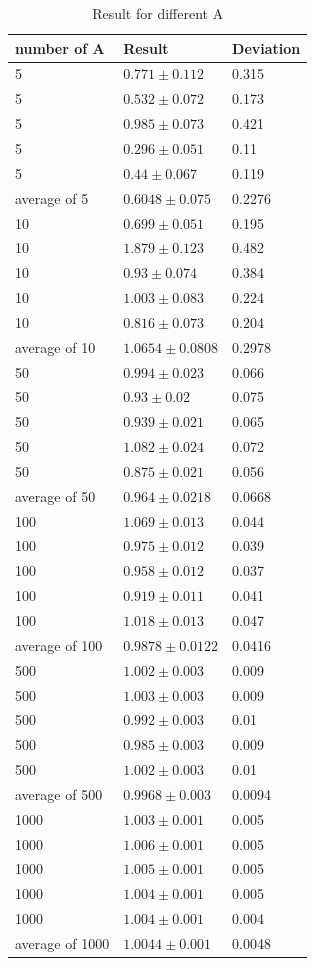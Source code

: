 \documentclass[11pt,letterpaper]{article}
\begin{document}
\begin{table}[h]
\caption{Result for different A\label{table1}}
\begin{tabular}{l l l}
\hline
 \textbf{number of A } & \textbf{Result}& \textbf{Deviation}\\
\hline
5	&$	0.771	\pm	0.112	$&	0.315	\\
5	&$	0.532	\pm	0.072	$&	0.173	\\
5	&$	0.985	\pm	0.073	$&	0.421	\\
5	&$	0.296	\pm	0.051	$&	0.11	\\
5	&$	0.44	\pm	0.067	$&	0.119	\\
average of 5	&$	0.6048	\pm	0.075	$&	0.2276	\\
10	&$	0.699	\pm	0.051	$&	0.195	\\
10	&$	1.879	\pm	0.123	$&	0.482	\\
10	&$	0.93	\pm	0.074	$&	0.384	\\
10	&$	1.003	\pm	0.083	$&	0.224	\\
10	&$	0.816	\pm	0.073	$&	0.204	\\
average of 10	&$	1.0654	\pm	0.0808	$&	0.2978	\\
50	&$	0.994	\pm	0.023	$&	0.066	\\
50	&$	0.93	\pm	0.02	$&	0.075	\\
50	&$	0.939	\pm	0.021	$&	0.065	\\
50	&$	1.082	\pm	0.024	$&	0.072	\\
50	&$	0.875	\pm	0.021	$&	0.056	\\
average of 50	&$	0.964	\pm	0.0218	$&	0.0668	\\
100	&$	1.069	\pm	0.013	$&	0.044	\\
100	&$	0.975	\pm	0.012	$&	0.039	\\
100	&$	0.958	\pm	0.012	$&	0.037	\\
100	&$	0.919	\pm	0.011	$&	0.041	\\
100	&$	1.018	\pm	0.013	$&	0.047	\\
average of 100	&$	0.9878	\pm	0.0122	$&	0.0416	\\
500	&$	1.002	\pm	0.003	$&	0.009	\\
500	&$	1.003	\pm	0.003	$&	0.009	\\
500	&$	0.992	\pm	0.003	$&	0.01	\\
500	&$	0.985	\pm	0.003	$&	0.009	\\
500	&$	1.002	\pm	0.003	$&	0.01	\\
average of 500	&$	0.9968	\pm	0.003	$&	0.0094	\\
1000	&$	1.003	\pm	0.001	$&	0.005	\\
1000	&$	1.006	\pm	0.001	$&	0.005	\\
1000	&$	1.005	\pm	0.001	$&	0.005	\\
1000	&$	1.004	\pm	0.001	$&	0.005	\\
1000	&$	1.004	\pm	0.001	$&	0.004	\\
average of 1000	&$	1.0044	\pm	0.001	$&	0.0048	\\
\hline
\end{tabular}
\end{table}
\end{document}
